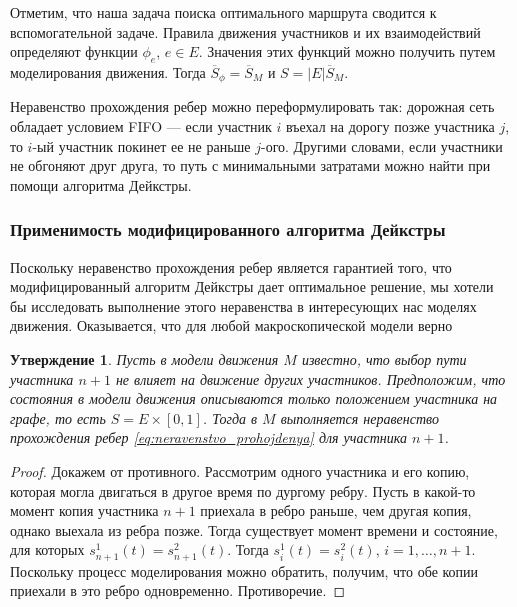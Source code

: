 \documentclass[12pt, a4paper]{article}
\newtheorem{state}{Утверждение}[section]
\begin{document}
	Отметим, что наша задача поиска оптимального маршрута сводится к вспомогательной задаче. Правила движения участников и их взаимодействий определяют функции $\phi_e$, $e \in E $. Значения этих функций можно получить путем моделирования движения. Тогда $\overline S_{\phi} = \overline S_M$ и $S = |E|\overline S_M$.
	
	Неравенство прохождения ребер можно переформулировать так: дорожная сеть обладает условием FIFO --- если участник $i$ въехал на дорогу позже участника $j$, то $i$-ый участник покинет ее не раньше $j$-ого. Другими словами, если участники не обгоняют друг друга, то путь с минимальными затратами можно найти при помощи алгоритма Дейкстры.
	
	\subsubsection{Применимость модифицированного алгоритма Дейкстры}
	
	Поскольку неравенство прохождения ребер является гарантией того, что модифицированный алгоритм Дейкстры дает оптимальное решение, мы хотели бы исследовать выполнение этого неравенства в интересующих нас моделях движения. Оказывается, что для любой макроскопической модели верно 
	
	\begin{state}
		Пусть в модели движения $M$ известно, что выбор пути участника $n+1$ не влияет на движение других участников. Предположим, что состояния в модели движения описываются только положением участника на графе, то есть $S = E \times [0, 1]$. Тогда в $M$ выполняется неравенство прохождения ребер \eqref{eq:neravenstvo_prohojdenya} для участника $n+1$.
	\end{state}
	
	\begin{proof}
		Докажем от противного. Рассмотрим одного участника и его копию, которая могла двигаться в другое время по дургому ребру. Пусть в какой-то момент копия участника $n+1$ приехала в ребро раньше, чем другая копия, однако выехала из ребра позже. Тогда существует момент времени и состояние, для которых $s_{n+1}^1(t)  = s_{n+1}^2(t)$. Тогда $s_i^1(t) = s_i^2(t)$, $i = 1, \ldots, n + 1$. Поскольку процесс моделирования можно обратить, получим, что обе копии приехали в это ребро одновременно. Противоречие.
	\end{proof}
	
\end{document}
